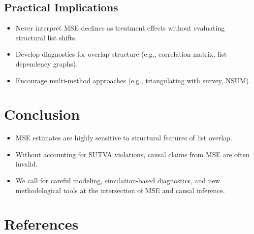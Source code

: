 \documentclass[
  12pt,
]{article}
\providecommand{\tightlist}{%
  \setlength{\itemsep}{0pt}\setlength{\parskip}{0pt}}\usepackage{longtable,booktabs,array}
\theoremstyle{plain}
\theoremstyle{definition}
\begin{document}
\subsection{Practical Implications}\label{practical-implications}

\begin{itemize}
\tightlist
\item
  Never interpret MSE declines as treatment effects without evaluating
  structural list shifts.\\
\item
  Develop diagnostics for overlap structure (e.g., correlation matrix,
  list dependency graphs).\\
\item
  Encourage multi-method approaches (e.g., triangulating with survey,
  NSUM).
\end{itemize}

\section{Conclusion}\label{conclusion}

\begin{itemize}
\tightlist
\item
  MSE estimates are highly sensitive to structural features of list
  overlap.\\
\item
  Without accounting for SUTVA violations, causal claims from MSE are
  often invalid.\\
\item
  We call for careful modeling, simulation-based diagnostics, and new
  methodological tools at the intersection of MSE and causal inference.
\end{itemize}

\newpage

\section*{References}\label{references}
\end{document}
